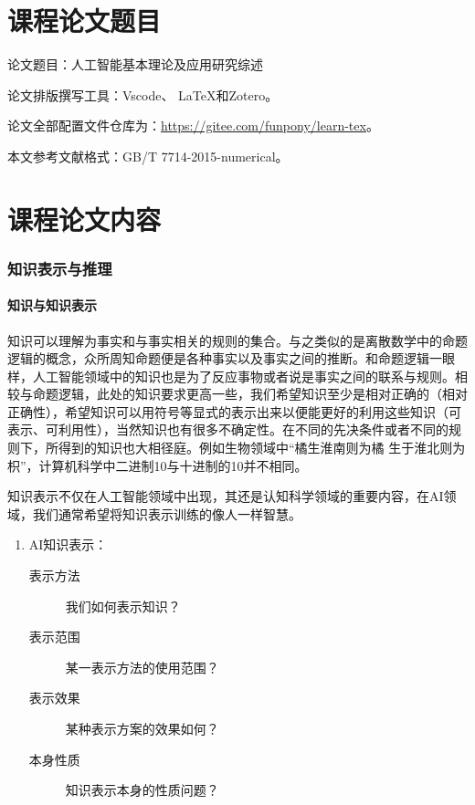 \documentclass[12pt,a4paper,UTF8]{ctexart}
\begin{document}
\tableofcontents

\part{课程论文题目}
论文题目：人工智能基本理论及应用研究综述

论文排版撰写工具：Vscode、 \LaTeX 和Zotero。

论文全部配置文件仓库为：\url{https://gitee.com/funpony/learn-tex}。

本文参考文献格式：GB/T 7714-2015-numerical。
\part{课程论文内容}
\section{知识表示与推理}
\subsection{知识与知识表示}
\textrm{知识可以理解为事实和与事实相关的规则的集合。与之类似的是离散数学中的命题逻辑的概念，众所周知命题便是各种事实以及事实之间的推断。和命题逻辑一眼样，人工智能领域中的知识也是为了反应事物或者说是事实之间的联系与规则。相较与命题逻辑，此处的知识要求更高一些，我们希望知识至少是相对正确的（相对正确性），希望知识可以用符号等显式的表示出来以便能更好的利用这些知识（可表示、可利用性），当然知识也有很多不确定性。在不同的先决条件或者不同的规则下，所得到的知识也大相径庭。例如生物领域中“橘生淮南则为橘 生于淮北则为枳”，计算机科学中二进制10与十进制的10并不相同。}

\textrm{知识表示不仅在人工智能领域中出现，其还是认知科学领域的重要内容，在AI领域，我们通常希望将知识表示训练的像人一样智慧。}

\begin{enumerate}
    \item AI知识表示：
    \begin{description}
        \item [表示方法] 我们如何表示知识？
        \item [表示范围] 某一表示方法的使用范围？
        \item [表示效果] 某种表示方案的效果如何？
        \item [本身性质] 知识表示本身的性质问题？
    \end{description}
\end{enumerate}
\end{document}
